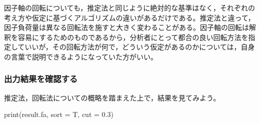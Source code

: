 \documentclass[
  a4paper,
]{ltjsbook}
\newenvironment{Shaded}{\begin{snugshade}}{\end{snugshade}}
\newcommand{\AttributeTok}[1]{\textcolor[rgb]{0.40,0.45,0.13}{#1}}
\newcommand{\FloatTok}[1]{\textcolor[rgb]{0.68,0.00,0.00}{#1}}
\newcommand{\FunctionTok}[1]{\textcolor[rgb]{0.28,0.35,0.67}{#1}}
\newcommand{\NormalTok}[1]{\textcolor[rgb]{0.00,0.23,0.31}{#1}}
\begin{document}
因子軸の回転についても，推定法と同じように絶対的な基準はなく，それぞれの考え方や仮定に基づくアルゴリズムの違いがあるだけである。推定法と違って，因子負荷量は異なる回転法を施すと大きく変わることがある。因子軸の回転は解釈を容易にするためのものであるから，分析者にとって都合の良い回転方法を指定していいが，その回転方法が何で，どういう仮定があるのかについては，自身の言葉で説明できるようになっていた方がいい。

\subsubsection{出力結果を確認する}\label{ux51faux529bux7d50ux679cux3092ux78baux8a8dux3059ux308b}

推定法，回転法についての概略を踏まえた上で，結果を見てみよう。

\begin{Shaded}
\begin{Highlighting}[]
\FunctionTok{print}\NormalTok{(result.fa, }\AttributeTok{sort =}\NormalTok{ T, }\AttributeTok{cut =} \FloatTok{0.3}\NormalTok{)}
\end{Highlighting}
\end{Shaded}
\end{document}
